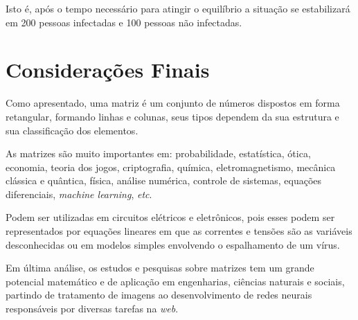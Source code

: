 \documentclass[a4paper,12pt]{article}
\begin{document}
Isto é, após o tempo necessário para atingir o equilíbrio a situação se estabilizará em 200 pessoas infectadas e 100 pessoas não infectadas.

\newpage

\section{Considerações Finais}

Como apresentado, uma matriz é um conjunto de números dispostos em forma retangular, formando linhas e colunas, seus tipos dependem da sua estrutura e sua classificação dos elementos.

As matrizes são muito importantes em: probabilidade, estatística, ótica, economia, teoria dos jogos, criptografia, química, eletromagnetismo, mecânica clássica e quântica, física, análise numérica, controle de sistemas, equações diferenciais, \textit{machine learning}, \textit{etc}.

Podem ser utilizadas em circuitos elétricos e eletrônicos, pois esses podem ser representados por equações lineares em que as correntes e tensões são as variáveis desconhecidas ou em modelos simples envolvendo o espalhamento de um vírus.

Em última análise, os estudos e pesquisas sobre matrizes tem um grande potencial matemático e de aplicação em engenharias, ciências naturais e sociais, partindo de tratamento de imagens ao desenvolvimento de redes neurais responsáveis por diversas tarefas na \textit{web}.

\newpage


\end{document}
